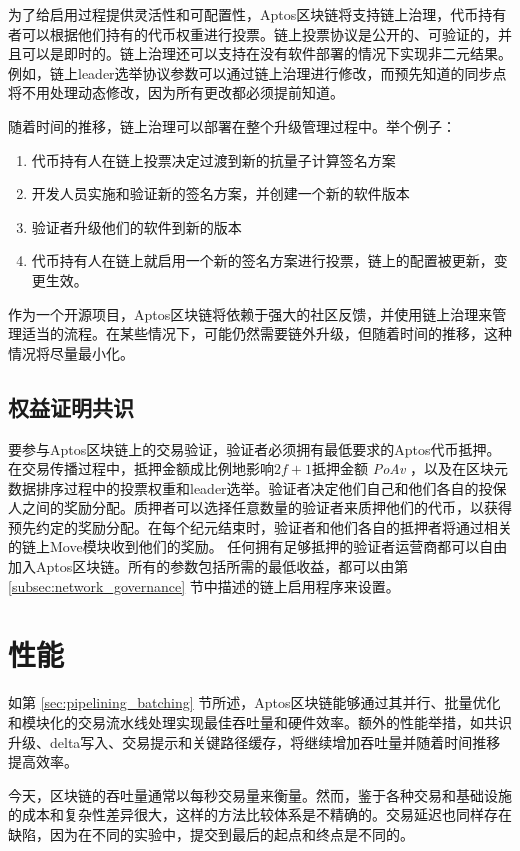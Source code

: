 \documentclass{article}
\begin{document}
为了给启用过程提供灵活性和可配置性，Aptos区块链将支持链上治理，代币持有者可以根据他们持有的代币权重进行投票。链上投票协议是公开的、可验证的，并且可以是即时的。链上治理还可以支持在没有软件部署的情况下实现非二元结果。 例如，链上leader选举协议参数可以通过链上治理进行修改，而预先知道的同步点将不用处理动态修改，因为所有更改都必须提前知道。

随着时间的推移，链上治理可以部署在整个升级管理过程中。举个例子：

\begin{enumerate}
\item 代币持有人在链上投票决定过渡到新的抗量子计算签名方案
\item 开发人员实施和验证新的签名方案，并创建一个新的软件版本
\item 验证者升级他们的软件到新的版本
\item 代币持有人在链上就启用一个新的签名方案进行投票，链上的配置被更新，变更生效。
\end{enumerate}

作为一个开源项目，Aptos区块链将依赖于强大的社区反馈，并使用链上治理来管理适当的流程。在某些情况下，可能仍然需要链外升级，但随着时间的推移，这种情况将尽量最小化。


\subsection{权益证明共识}
要参与Aptos区块链上的交易验证，验证者必须拥有最低要求的Aptos代币抵押。在交易传播过程中，抵押金额成比例地影响$2f+1$抵押金额 \emph{PoAv} ，以及在区块元数据排序过程中的投票权重和leader选举。验证者决定他们自己和他们各自的投保人之间的奖励分配。质押者可以选择任意数量的验证者来质押他们的代币，以获得预先约定的奖励分配。在每个纪元结束时，验证者和他们各自的抵押者将通过相关的链上Move模块收到他们的奖励。
任何拥有足够抵押的验证者运营商都可以自由加入Aptos区块链。所有的参数包括所需的最低收益，都可以由第 \ref{subsec:network_governance} 节中描述的链上启用程序来设置。


\section{性能}
\label{sec:performance}

如第 \ref{sec:pipelining_batching} 节所述，Aptos区块链能够通过其并行、批量优化和模块化的交易流水线处理实现最佳吞吐量和硬件效率。额外的性能举措，如共识升级、delta写入、交易提示和关键路径缓存，将继续增加吞吐量并随着时间推移提高效率。

今天，区块链的吞吐量通常以每秒交易量来衡量。然而，鉴于各种交易和基础设施的成本和复杂性差异很大，这样的方法比较体系是不精确的。交易延迟也同样存在缺陷，因为在不同的实验中，提交到最后的起点和终点是不同的。
\end{document}
